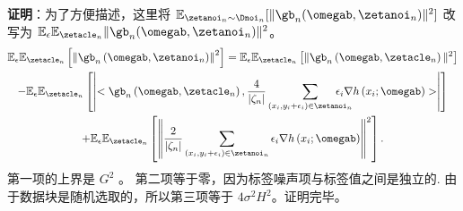 \noindent \textbf{证明}：为了方便描述，这里将 $\mathbb{E}_{\zetanoi_n\sim \Dnoi_n}[\Vert \gb_n(\omegab, \zetanoi_n) \Vert^2]$ 改写为 $\mathbb{E}_\epsilon\mathbb{E}_{\zetacle_n}\Vert \gb_n(\omegab, \zetanoi_n) \Vert^2$。
\begin{multline}\label{eq:proof-s1}
\mathbb{E}_\epsilon\mathbb{E}_{\zetacle_n}\left[\left\Vert \gb_n\left(\omegab, \zetanoi_n\right) \right\Vert^2\right] 
= \mathbb{E}_\epsilon\mathbb{E}_{\zetacle_n}\left[\Vert\gb_n\left(\omegab,\zetacle_n\right)\Vert^2\right] \\
-\mathbb{E}_\epsilon\mathbb{E}_{\zetacle_n}\left[\left|<\gb_n\left(\omegab,\zetacle_n\right),\frac{4}{|\zeta_n|}\sum_{\left(x_i,y_i+\epsilon_i\right)\in \zetanoi_n}\!\!\!\!\!\!\!\!\!\!\epsilon_i\nabla h\left(x_{i};\omegab\right)>\right|\right]\\
+\mathbb{E}_\epsilon\mathbb{E}_{\zetacle_n}\left[\left\Vert \frac{2}{|\zeta_n|}\sum_{\left(x_i,y_i+\epsilon_i\right)\in \zetanoi_n}\epsilon_i\nabla h\left(x_{i};\omegab\right)\right\Vert^2\right].
\end{multline}
第一项的上界是 $G^2$ 。 第二项等于零，因为标签噪声项与标签值之间是独立的. 由于数据块是随机选取的，所以第三项等于 $4\sigma^2H^2$。证明完毕。 

